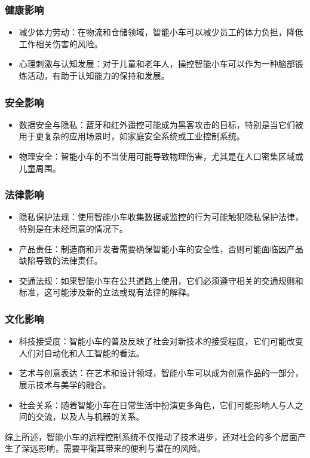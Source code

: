 \subsubsection{健康影响}

\begin{itemize}
    \item 减少体力劳动：在物流和仓储领域，智能小车可以减少员工的体力负担，降低工作相关伤害的风险。
    \item 心理刺激与认知发展：对于儿童和老年人，操控智能小车可以作为一种脑部锻炼活动，有助于认知能力的保持和发展。
\end{itemize}

\subsubsection{安全影响}

\begin{itemize}
    \item 数据安全与隐私：蓝牙和红外遥控可能成为黑客攻击的目标，特别是当它们被用于更复杂的应用场景时，如家庭安全系统或工业控制系统。
    \item 物理安全：智能小车的不当使用可能导致物理伤害，尤其是在人口密集区域或儿童周围。
\end{itemize}

\subsubsection{法律影响}

\begin{itemize}
    \item 隐私保护法规：使用智能小车收集数据或监控的行为可能触犯隐私保护法律，特别是在未经同意的情况下。
    \item 产品责任：制造商和开发者需要确保智能小车的安全性，否则可能面临因产品缺陷导致的法律责任。
    \item 交通法规：如果智能小车在公共道路上使用，它们必须遵守相关的交通规则和标准，这可能涉及新的立法或现有法律的解释。
\end{itemize}

\subsubsection{文化影响}

\begin{itemize}
    \item 科技接受度：智能小车的普及反映了社会对新技术的接受程度，它们可能改变人们对自动化和人工智能的看法。
    \item 艺术与创意表达：在艺术和设计领域，智能小车可以成为创意作品的一部分，展示技术与美学的融合。
    \item 社会关系：随着智能小车在日常生活中扮演更多角色，它们可能影响人与人之间的交流，以及人与机器的关系。
\end{itemize}

综上所述，智能小车的远程控制系统不仅推动了技术进步，还对社会的多个层面产生了深远影响，需要平衡其带来的便利与潜在的风险。
